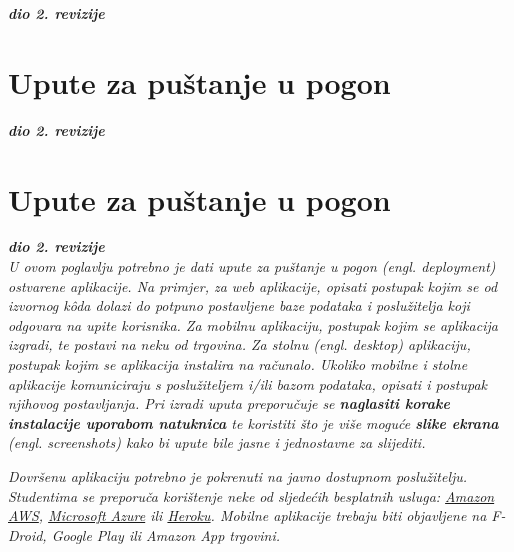 			\textbf{\textit{dio 2. revizije}}


\begin{comment}		
		\section{Dijagram razmještaja}
			
			\textbf{\textit{dio 2. revizije}}
			
			 \textit{Potrebno je umetnuti \textbf{specifikacijski} dijagram razmještaja i opisati ga. Moguće je umjesto specifikacijskog dijagrama razmještaja umetnuti dijagram razmještaja instanci, pod uvjetom da taj dijagram bolje opisuje neki važniji dio sustava.}
			
			\eject 
\end{comment}

\newpage
\section{Upute za puštanje u pogon}
		
		\textbf{\textit{dio 2. revizije}}




		\section{Upute za puštanje u pogon}
		
			\textbf{\textit{dio 2. revizije}}\\
		
			 \textit{U ovom poglavlju potrebno je dati upute za puštanje u pogon (engl. deployment) ostvarene aplikacije. Na primjer, za web aplikacije, opisati postupak kojim se od izvornog kôda dolazi do potpuno postavljene baze podataka i poslužitelja koji odgovara na upite korisnika. Za mobilnu aplikaciju, postupak kojim se aplikacija izgradi, te postavi na neku od trgovina. Za stolnu (engl. desktop) aplikaciju, postupak kojim se aplikacija instalira na računalo. Ukoliko mobilne i stolne aplikacije komuniciraju s poslužiteljem i/ili bazom podataka, opisati i postupak njihovog postavljanja. Pri izradi uputa preporučuje se \textbf{naglasiti korake instalacije uporabom natuknica} te koristiti što je više moguće \textbf{slike ekrana} (engl. screenshots) kako bi upute bile jasne i jednostavne za slijediti.}
			
			
			 \textit{Dovršenu aplikaciju potrebno je pokrenuti na javno dostupnom poslužitelju. Studentima se preporuča korištenje neke od sljedećih besplatnih usluga: \href{https://aws.amazon.com/}{Amazon AWS}, \href{https://azure.microsoft.com/en-us/}{Microsoft Azure} ili \href{https://www.heroku.com/}{Heroku}. Mobilne aplikacije trebaju biti objavljene na F-Droid, Google Play ili Amazon App trgovini.}
			
			
			\eject 
